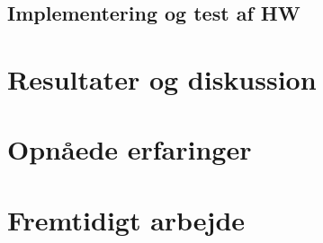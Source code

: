 \subsection{Implementering og test af HW}

\section{Resultater og diskussion}

\section{Opnåede erfaringer}

\section{Fremtidigt arbejde}


